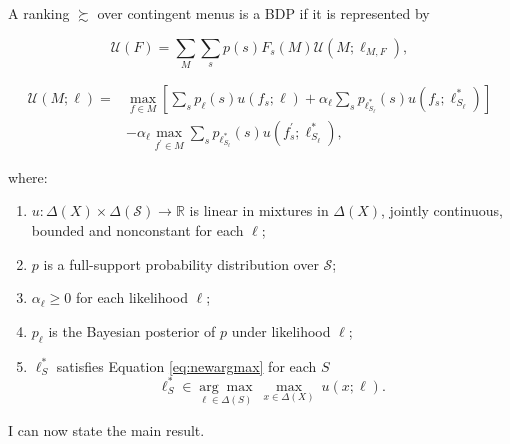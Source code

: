 \begin{definition}\label{def:bdp}
	A ranking \( \succsim \) over contingent menus is a BDP if it is represented by

	\begin{equation}
		\mathscr{U}(F)= \sum_{M} \sum_{s} p \left( s \right) F_{s} \left( M \right) \mathcal{U} \left(M ; \ell_{M, F} \right),
	\end{equation}

	\begin{equation}
		\begin{aligned}
			\mathcal{U} \left(M ; \ell \right) = & \max_{f \in M}\left[ \sum_{s} p_{\ell} \left( s \right) u \left( f_{s} ; \ell \right) +\alpha _{\ell} \sum_{s} p_{\ell^{*}_{S_{\ell}}} \left( s \right) u \left( f_{s} ; \ell^{*}_{S_{\ell}} \right) \right] \\
			                                     & - \alpha_{\ell} \max_{f^{\prime} \in M} \sum_{s} p_{\ell^{*}_{S_{\ell}}} \left( s \right) u\left(f^{\prime}_{s} ; \ell^{*}_{S_{\ell}} \right) ,
		\end{aligned}
	\end{equation}

	where:

	\begin{enumerate}
		\item \( u : \Delta \left( X \right) \times \Delta \left( \mathcal{S} \right) \rightarrow \mathbb{R} \) is linear in mixtures in \( \Delta \left( X \right) \), jointly continuous, bounded and nonconstant for each \( \ell \);
		\item \( p \) is a full-support probability distribution over \( \mathcal{S} \);
		\item \( \alpha_{\ell} \geq 0 \) for each likelihood \( \ell \);
		\item \( p_{\ell} \) is the Bayesian posterior of \( p \) under likelihood \( \ell \);
		\item \( \ell^{*}_{S} \) satisfies Equation \eqref{eq:newargmax} for each \( S \)
		      \begin{equation}\label{eq:newargmax}
			      \ell^{*}_{S} \in \underset{\ell \in \Delta \left( S \right)}{\arg \max} \: \max_{x \in \Delta \left( X \right)} \: u \left( x ; \ell \right) .
		      \end{equation}
	\end{enumerate}

\end{definition}

I can now state the main result.

